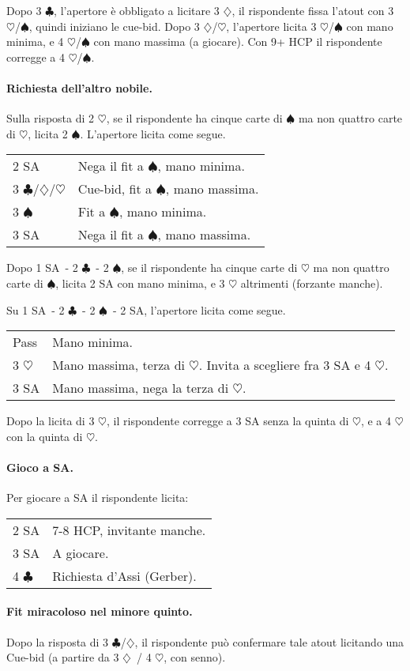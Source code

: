 \documentclass[a4paper,10pt]{article}
\renewcommand{\c}{$\clubsuit$\xspace}
\renewcommand{\d}{$\diamondsuit$\xspace}
\newcommand{\h}{$\heartsuit$\xspace}
\newcommand{\s}{$\spadesuit$\xspace}
\newcommand{\sa}{SA\xspace}
\newcommand{\smallspace}{\vskip0.3cm}
\newenvironment{twocol}
  {\smallspace\noindent\begin{tabular}{l p{0.78\textwidth}}}
  {\end{tabular}\smallspace}
\begin{document}
Dopo 3 \c, l'apertore è obbligato a licitare 3 \d, il rispondente fissa l'atout con 3 \h/\s, quindi iniziano le cue-bid.
Dopo 3 \d/\h, l'apertore licita 3 \h/\s con mano minima, e 4 \h/\s con mano massima (a giocare). Con 9+ HCP il rispondente corregge a 4 \h/\s.

\paragraph{Richiesta dell'altro nobile.}
Sulla risposta di 2 \h, se il rispondente ha cinque carte di \s ma non quattro carte di \h, licita 2 \s. L'apertore licita come segue.

\begin{twocol}
	2 \sa & Nega il fit a \s, mano minima. \\
	3 \c/\d/\h & Cue-bid, fit a \s, mano massima. \\
	3 \s & Fit a \s, mano minima. \\
	3 \sa & Nega il fit a \s, mano massima.
\end{twocol}

Dopo 1 \sa\ - 2 \c\ - 2 \s, se il rispondente ha cinque carte di \h ma non quattro carte di \s, licita 2 \sa con mano minima, e 3 \h altrimenti (forzante manche).

Su 1 \sa\ - 2 \c\ - 2 \s\ - 2 \sa, l'apertore licita come segue.

\begin{twocol}
	Pass & Mano minima. \\
	3 \h & Mano massima, terza di \h. Invita a scegliere fra 3 \sa e 4 \h. \\
	3 \sa & Mano massima, nega la terza di \h. \\
\end{twocol}

Dopo la licita di 3 \h, il rispondente corregge a 3 \sa senza la quinta di \h, e a 4 \h con la quinta di \h.

\paragraph{Gioco a SA.}
Per giocare a SA il rispondente licita:
\begin{twocol}
	2 \sa & 7-8 HCP, invitante manche. \\
	3 \sa & A giocare. \\
	4 \c & Richiesta d'Assi (Gerber).
\end{twocol}

\paragraph{Fit miracoloso nel minore quinto.}
Dopo la risposta di 3 \c/\d, il rispondente può confermare tale atout licitando una Cue-bid (a partire da 3 \d\ / 4 \h, con senno).
\end{document}
